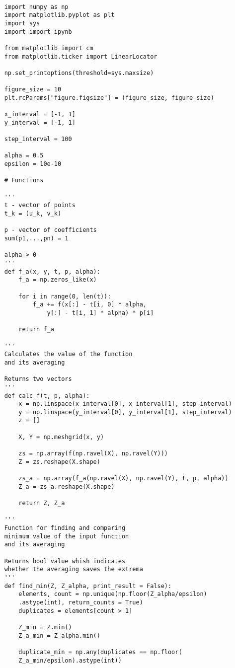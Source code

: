\documentclass[12pt]{article}
\begin{document}
\begin{verbatim}
	
	import numpy as np
	import matplotlib.pyplot as plt
	import sys
	import import_ipynb
	
	from matplotlib import cm
	from matplotlib.ticker import LinearLocator
	
	np.set_printoptions(threshold=sys.maxsize)
	
	figure_size = 10
	plt.rcParams["figure.figsize"] = (figure_size, figure_size)
	
	x_interval = [-1, 1]
	y_interval = [-1, 1]
	
	step_interval = 100
	
	alpha = 0.5
	epsilon = 10e-10
	
	# Functions
	
	'''
	t - vector of points
	t_k = (u_k, v_k)
	
	p - vector of coefficients
	sum(p1,...,pn) = 1
	
	alpha > 0
	'''
	def f_a(x, y, t, p, alpha):
		f_a = np.zeros_like(x)
		
		for i in range(0, len(t)):
			f_a += f(x[:] - t[i, 0] * alpha, 
				y[:] - t[i, 1] * alpha) * p[i]
		
		return f_a
	
	'''
	Calculates the value of the function
	and its averaging
	
	Returns two vectors
	'''
	def calc_f(t, p, alpha):
		x = np.linspace(x_interval[0], x_interval[1], step_interval)
		y = np.linspace(y_interval[0], y_interval[1], step_interval)
		z = []
		
		X, Y = np.meshgrid(x, y)
		
		zs = np.array(f(np.ravel(X), np.ravel(Y)))
		Z = zs.reshape(X.shape)
		
		zs_a = np.array(f_a(np.ravel(X), np.ravel(Y), t, p, alpha))
		Z_a = zs_a.reshape(X.shape)
		
		return Z, Z_a
		
	'''
	Function for finding and comparing
	minimum value of the input function
	and its averaging
	
	Returns bool value whish indicates
	whether the averaging saves the extrema
	'''
	def find_min(Z, Z_alpha, print_result = False):
		elements, count = np.unique(np.floor(Z_alpha/epsilon)
		.astype(int), return_counts = True)
		duplicates = elements[count > 1]
		
		Z_min = Z.min()
		Z_a_min = Z_alpha.min()
		
		duplicate_min = np.any(duplicates == np.floor(
		Z_a_min/epsilon).astype(int))
		

\end{verbatim}
\end{document}
